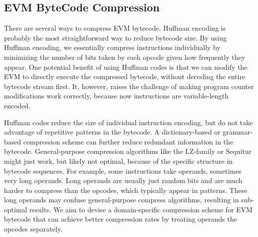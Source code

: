 
\subsection{EVM ByteCode Compression}\label{sec:evmcompress}

There are several ways to compress EVM bytecode. Huffman encoding is probably the most straightforward
way to reduce bytecode size. By using Huffman encoding, we essentially compress instructions individually
by minimizing the number of bits taken by each opcode given how frequently they appear. One potential
benefit of using Huffman codes is that we can modify the EVM to directly execute the compressed bytecode,
without decoding the entire bytecode stream first. It, however, raises the challenge of making program counter modifications work
correctly, because now instructions are variable-length encoded.

Huffman codes reduce the size of individual instruction encoding, but do not take advantage of repetitive patterns in the bytecode.
A dictionary-based or grammar-based compression scheme can further reduce redundant information in the bytecode.
General-purpose compression algorithms like the LZ-family or Sequitur might just work,
but likely not optimal, because of the specific structure in bytecode sequences.
For example, some instructions take operands, sometimes very long operands.
Long operands are usually just random bits and are much harder to compress than the opcodes, which typically appear in patterns.
These long operands may confuse general-purpose compress algorithms, resulting in sub-optimal results.
We aim to devise a domain-specific compression scheme for EVM bytecode that can achieve better compression rates
by treating operands the opcodes separately.

